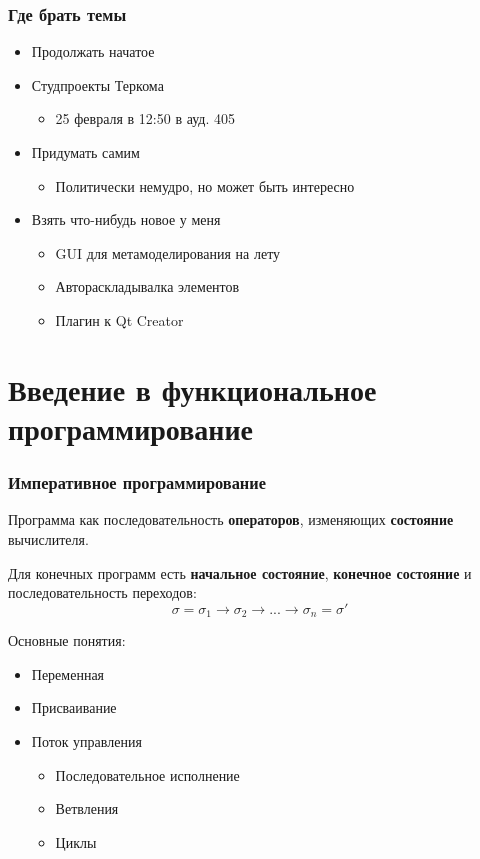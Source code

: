 \documentclass[xetex,mathserif,serif]{beamer}
\begin{document}
	\begin{frame}
		\frametitle{Где брать темы}
		\begin{itemize}
			\item Продолжать начатое
			\item Студпроекты Теркома
			\begin{itemize}
				\item 25 февраля в 12:50 в ауд. 405
			\end{itemize}
			\item Придумать самим 
			\begin{itemize}
				\item Политически немудро, но может быть интересно
			\end{itemize}
			\item Взять что-нибудь новое у меня
			\begin{itemize}
				\item GUI для метамоделирования на лету
				\item Автораскладывалка элементов
				\item Плагин к Qt Creator
			\end{itemize}
		\end{itemize}					
	\end{frame}		
	
	\section{Введение в функциональное программирование}
	
	\begin{frame}
		\frametitle{Императивное программирование}
		Программа как последовательность \textbf{операторов}, изменяющих \textbf{состояние} вычислителя.

		Для конечных программ есть \textbf{начальное состояние}, \textbf{конечное состояние} и последовательность переходов:
		$$\sigma = \sigma_1 \rightarrow \sigma_2 \rightarrow ... \rightarrow \sigma_n = \sigma'$$
		
		Основные понятия:
		\begin{itemize}
			\item Переменная
			\item Присваивание
			\item Поток управления
			\begin{itemize}
				\item Последовательное исполнение
				\item Ветвления
				\item Циклы
			\end{itemize}
		\end{itemize}
	\end{frame}
	
\end{document}
